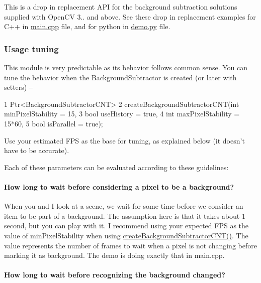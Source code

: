 This is a drop in replacement A\+PI for the background subtraction solutions supplied with Open\+CV 3.. and above. See these drop in replacement examples for C++ in \hyperlink{main_8cpp-example}{main.cpp} file, and for python in \hyperlink{python_2demo_8py-example}{demo.py} file.

\subsubsection*{Usage tuning}

This module is very predictable as it\textquotesingle{}s behavior follows common sense. You can tune the behavior when the Background\+Subtractor is created (or later with setters) –


\begin{DoxyCode}
1 Ptr<BackgroundSubtractorCNT>
2 createBackgroundSubtractorCNT(int minPixelStability = 15,
3                               bool useHistory = true,
4                               int maxPixelStability = 15*60,
5                               bool isParallel = true);
\end{DoxyCode}

\begin{DoxyItemize}
\item Use your estimated F\+PS as the base for tuning, as explained below (it doesn’t have to be accurate).
\item Each of these parameters can be evaluated according to these guidelines\+:
\end{DoxyItemize}

\paragraph*{How long to wait before considering a pixel to be a background?}

When you and I look at a scene, we wait for some time before we consider an item to be part of a background. The assumption here is that it takes about 1 second, but you can play with it. I recommend using your expected F\+PS as the value of min\+Pixel\+Stability when using \hyperlink{bgsubcnt_8h_a6a6efd913954320be33f39c32a4c5a7e}{create\+Background\+Subtractor\+C\+N\+T()}. The value represents the number of frames to wait when a pixel is not changing before marking it as background. The demo is doing exactly that in main.\+cpp.

\paragraph*{How long to wait before recognizing the background changed?}


